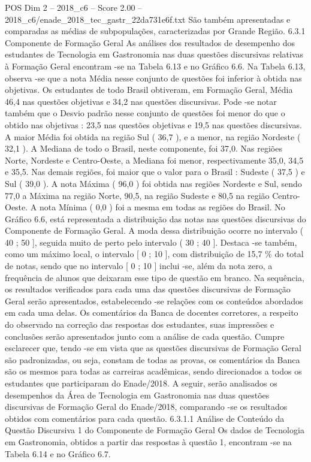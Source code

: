 \begin{textsample}{POS Dim 2 – 2018\_c6 – Score 2.00 – 2018\_c6/enade\_2018\_tec\_gastr\_22da731e6f.txt}
São também apresentadas e comparadas as médias de subpopulações, caracterizadas por Grande Região. 6.3.1 Componente de Formação Geral As análises dos resultados de desempenho dos estudantes de Tecnologia em Gastronomia nas duas questões discursivas relativas à Formação Geral encontram -se na Tabela 6.13 e no Gráfico 6.6.
Na Tabela 6.13, observa -se que a nota Média nesse conjunto de questões foi inferior à obtida nas objetivas.
Os estudantes de todo Brasil obtiveram, em Formação Geral, Média 46,4 nas questões objetivas e 34,2 nas questões discursivas.
Pode -se notar também que o Desvio padrão nesse conjunto de questões foi menor do que o obtido nas objetivas : 23,5 nas questões objetivas e 19,5 nas questões discursivas.
A maior Média foi obtida na região Sul ( 36,7 ), e a menor, na região Nordeste ( 32,1 ).
A Mediana de todo o Brasil, neste componente, foi 37,0.
Nas regiões Norte, Nordeste e Centro-Oeste, a Mediana foi menor, respectivamente 35,0, 34,5 e 35,5.
Nas demais regiões, foi maior que o valor para o Brasil : Sudeste ( 37,5 ) e Sul ( 39,0 ).
A nota Máxima ( 96,0 ) foi obtida nas regiões Nordeste e Sul, sendo 77,0 a Máxima na região Norte, 90,5, na região Sudeste e 80,5 na região Centro-Oeste.
A nota Mínima ( 0,0 ) foi a mesma em todas as regiões do Brasil.
No Gráfico 6.6, está representada a distribuição das notas nas questões discursivas do Componente de Formação Geral.
A moda dessa distribuição ocorre no intervalo ( 40 ; 50 ], seguida muito de perto pelo intervalo ( 30 ; 40 ].
Destaca -se também, como um máximo local, o intervalo [ 0 ; 10 ], com distribuição de 15,7 \% do total de notas, sendo que no intervalo [ 0 ; 10 ] inclui -se, além da nota zero, a frequência de alunos que deixaram esse tipo de questão em branco.
Na sequência, os resultados verificados para cada uma das questões discursivas de Formação Geral serão apresentados, estabelecendo -se relações com os conteúdos abordados em cada uma delas.
Os comentários da Banca de docentes corretores, a respeito do observado na correção das respostas dos estudantes, suas impressões e conclusões serão apresentados junto com a análise de cada questão.
Cumpre esclarecer que, tendo -se em vista que as questões discursivas de Formação Geral são padronizadas, ou seja, constam de todas as provas, os comentários da Banca são os mesmos para todas as carreiras acadêmicas, sendo direcionados a todos os estudantes que participaram do Enade/2018.
A seguir, serão analisados os desempenhos da Área de Tecnologia em Gastronomia nas duas questões discursivas de Formação Geral do Enade/2018, comparando -se os resultados obtidos com comentários para cada questão. 6.3.1.1 Análise de Conteúdo da Questão Discursiva 1 do Componente de Formação Geral Os dados de Tecnologia em Gastronomia, obtidos a partir das respostas à questão 1, encontram -se na Tabela 6.14 e no Gráfico 6.7.

\end{textsample}
